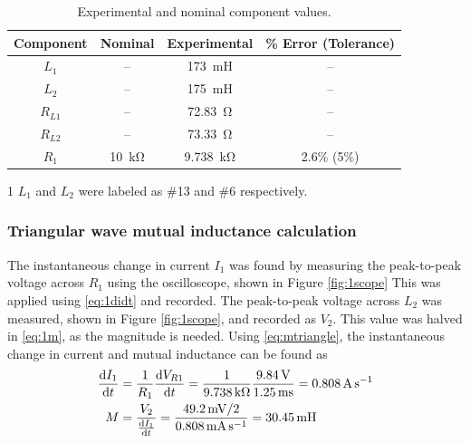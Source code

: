 \documentclass{report}
\begin{document}
\begin{table}[h]
	\centering
	\caption{Experimental and nominal component values.}
	\begin{threeparttable}
		\begin{tabular}{cccc}
			\toprule
			Component & Nominal & Experimental & \% Error (Tolerance) \\
			\midrule
			$L_1$\tnote{1}  & -- & \SI{173}{\milli\henry} & -- \\
			$L_2$\tnote{1}    & -- & \SI{175}{\milli\henry} & -- \\
			$R_{L1}$ & -- & \SI{72.83}{\ohm} & -- \\
			$R_{L2}$ & -- & \SI{73.33}{\ohm} & -- \\
			$R_1$ & \SI{10}{\kohm} & \SI{9.738}{\kohm} & 2.6\% (5\%) \\
			\bottomrule
		\end{tabular}
		\begin{tablenotes}
			\footnotesize
			\item[1] $L_1$ and $L_2$ were labeled as \#13 and \#6 respectively.
		\end{tablenotes}
	\end{threeparttable}
		\label{table:lab1components}
\end{table}

\subsubsection{Triangular wave mutual inductance calculation}
The instantaneous change in current $I_1$ was found by measuring the peak-to-peak voltage across $R_1$ using the oscilloscope, shown in Figure \ref{fig:1scope} This was applied using \eqref{eq:1didt} and recorded. The peak-to-peak voltage across $L_2$ was measured, shown in Figure \ref{fig:1scope}, and recorded as $V_2$. This value was halved in \eqref{eq:1m}, as the magnitude is needed. Using \eqref{eq:mtriangle}, the instantaneous change in current and mutual inductance can be found as
\begin{subequations}
	\begin{align}
		\dv{I_1}{t} & = \frac{1}{R_1} \dv{V_{R1}}{t} = \frac{1}{\SI{9.738}{\kohm}} \frac{\SI{9.84}{\V}}{\SI{1.25}{\ms}} = \SI{0.808}{\A\per\s} \\
		M & = \frac{V_2}{\dv{I_1}{t}} = \frac{\SI{49.2}{\mV} / 2}{\SI{0.808}{\mA\per\s}} = \SI{30.45}{\milli\henry} \label{eq:1m}
	\end{align}
\end{subequations}
\end{document}

